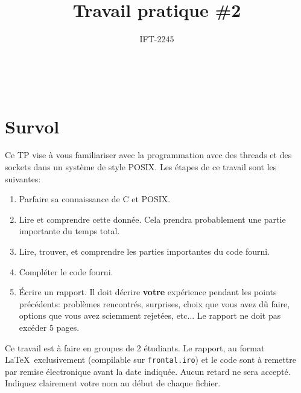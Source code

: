 \documentclass{article}
\title{Travail pratique \#2}
\author{IFT-2245}
\begin{document}
\maketitle

{\centering {} \\}

\newcommand \mML {\ensuremath\mu\textsl{ML}}
\newcommand \kw [1] {\textsf{#1}}
\newcommand \id [1] {\textsl{#1}}
\newcommand \punc [1] {\kw{`#1'}}
\newcommand \str [1] {\texttt{"#1"}}
\newenvironment{outitemize}{
  \begin{itemize}
  \let \origitem \item \def \item {\origitem[]\hspace{-18pt}}
}{
  \end{itemize}
}
\newcommand \Align [2][t] {
  \begin{array}[#1]{@{}l}
    #2
  \end{array}}

\section{Survol}

Ce TP vise à vous familiariser avec la programmation avec des threads et des
sockets dans un système de style POSIX.
Les étapes de ce travail sont les suivantes:
\begin{enumerate}
\item Parfaire sa connaissance de C et POSIX.
\item Lire et comprendre cette donnée.  Cela prendra probablement une partie
  importante du temps total.
\item Lire, trouver, et comprendre les parties importantes du code fourni.
\item Compléter le code fourni.
\item Écrire un rapport.  Il doit décrire \textbf{votre} expérience pendant
  les points précédents: problèmes rencontrés, surprises, choix que vous
  avez dû faire, options que vous avez sciemment rejetées, etc...  Le
  rapport ne doit pas excéder 5 pages.
\end{enumerate}

Ce travail est à faire en groupes de 2 étudiants.  Le rapport, au format
\LaTeX\ exclusivement (compilable sur \texttt{frontal.iro}) et le code sont
à remettre par remise électronique avant la date indiquée.  Aucun retard ne
sera accepté.  Indiquez clairement votre nom au début de chaque fichier.
\end{document}
